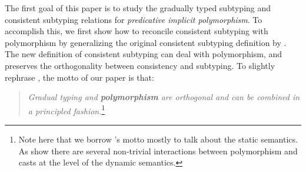 \begin{comment}
Instead several works use alternative notions such as
\emph{compatibility} of types~\citep{} or adapted versions of type
consistency~\citep{}.
For instance both \citet{ahmed2011blame} (in the
Polymorphic Blame calculus) and \citet{yuu2017poly} define
notions of \emph{compatibility}. \jeremy{inaccurate} These two notions of compatibility
are different from each other, and they are not derived from
consistency and subtyping.
\ningning{Mention however they are trying to mixing subtyping and consistency to some degree?}
\ningning{one advantage of their systems is that they do no guessing}
Thus one first criticism to compatibility is 
that it lacks the orthogonality of notions (subtyping and consistency)
afforded by consistent subtyping~\citep{siek2007gradual}  \bruno{Ningning, has this criticism
  been pointed out by someone else before? If so, who? Citing them
  would strenghten our point}.
\ningning{I think no except Siek}
Moreover, the 
proposals for compatibility are different, which makes it unclear 
of which one is more appropriate.
\end{comment}

The first goal of this paper is to study the gradually typed subtyping
and consistent subtyping relations for \emph{predicative implicit polymorphism}.
To accomplish this, we first show how
to reconcile consistent subtyping with polymorphism by generalizing
the original consistent subtyping definition by
\citeauthor{siek2007gradual}. The new definition of consistent
subtyping can deal with polymorphism, and preserves the orthogonality
between consistency and subtyping. To slightly rephrase \citeauthor{siek2007gradual},
the motto of our paper is that:

\begin{quote}\emph{Gradual typing and {\bf polymorphism} are orthogonal and can be combined
in a principled fashion.}\footnote{Note here that we borrow \citeauthor{siek2007gradual}'s motto
  mostly to talk about the static semantics. As \citet{ahmed2011blame}
show there are several non-trivial interactions between
polymorphism and casts at the level of the dynamic semantics.}
\end{quote}

